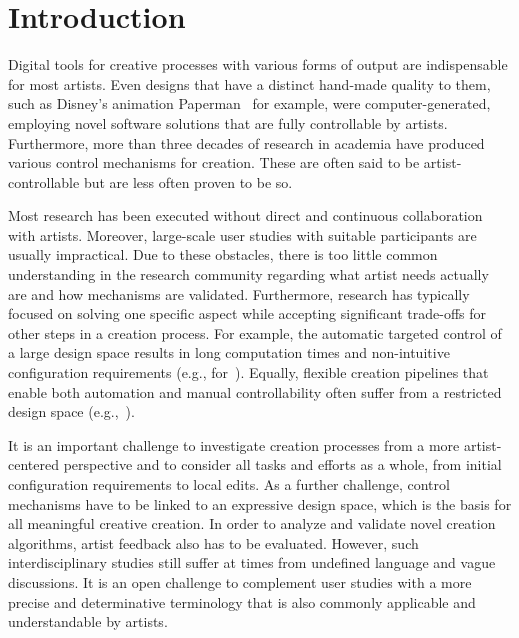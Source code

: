 

\section{Introduction}

Digital tools for creative processes with various forms of output are indispensable for most artists. Even designs that have a distinct hand-made quality to them, such as Disney's animation Paperman~\cite{disney_2012_ppm} for example, were computer-generated, employing novel software solutions that are fully controllable by artists. Furthermore, more than three decades of research in academia have produced various control mechanisms for creation. These are often said to be artist-controllable but are less often proven to be so.

Most research has been executed without direct and continuous collaboration with artists. Moreover, large-scale user studies with suitable participants are usually impractical. Due to these obstacles, there is too little common understanding in the research community regarding what artist needs actually are and how mechanisms are validated. Furthermore, research has typically focused on solving one specific aspect while accepting significant trade-offs for other steps in a creation process.
For example, the automatic targeted control of a large design space results in long computation times and non-intuitive configuration requirements (e.g., for~\cite{bourque_2004_ptm, wong_1998_cgf}). Equally, flexible creation pipelines that enable both automation and manual controllability often suffer from a restricted design space (e.g.,~\cite{santoni_2016_ggp}).  

It is an important challenge to investigate creation processes from a more artist-centered perspective and to consider all tasks and efforts as a whole, from initial configuration requirements to local edits. As a further challenge, control mechanisms have to be linked to an expressive design space, which is the basis for all meaningful creative creation. In order to analyze and validate novel creation algorithms, artist feedback also has to be evaluated. However, such interdisciplinary studies still suffer at times from undefined language and vague discussions. It is an open challenge to complement user studies with a more precise and determinative terminology that is also commonly applicable and understandable by artists.

